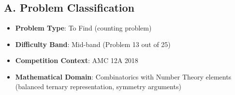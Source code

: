 \documentclass[12pt]{article}
\begin{document}
\begin{problemconfigbox}
\subsection*{A. Problem Classification}
\begin{itemize}[leftmargin=*]
    \item \textbf{Problem Type}: To Find (counting problem)
    \item \textbf{Difficulty Band}: Mid-band (Problem 13 out of 25)
    \item \textbf{Competition Context}: AMC 12A 2018
    \item \textbf{Mathematical Domain}: Combinatorics with Number Theory elements (balanced ternary representation, symmetry arguments)
\end{itemize}


\end{problemconfigbox}
\end{document}
